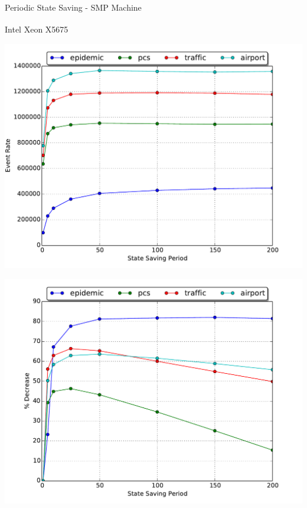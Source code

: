 \documentclass[10pt]{beamer}
\begin{document}
\begin{frame}{Periodic State Saving - SMP Machine}
    \begin{block}{Intel\textsuperscript{\textregistered} Xeon\textsuperscript{\textregistered} X5675}
        \smallskip
        \begin{minipage}{0.5\textwidth}
            \includegraphics[width=\textwidth]{../figs/state_saving/bc/eventrate.pdf}
        \end{minipage}%
        \begin{minipage}{0.5\textwidth}
            \includegraphics[width=\textwidth]{../figs/state_saving/bc/percent_memory_decrease.pdf}
        \end{minipage}
    \end{block}
\end{frame}
\end{document}
